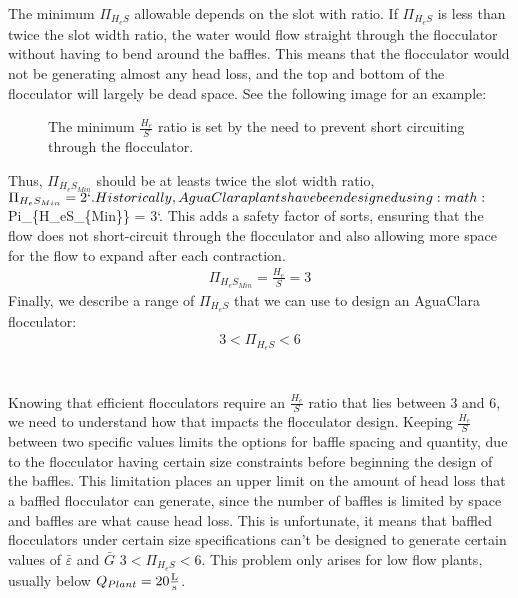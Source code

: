 \documentclass[letterpaper,10pt,english]{sphinxmanual}
\let\sphinxpxdimen\pdfpxdimen\else\newdimen\sphinxpxdimen
\begin{document}
The minimum \(\Pi_{H_eS}\) allowable depends on the slot with ratio. If \(\Pi_{H_eS}\) is less than twice the slot width ratio, the water would flow straight through the flocculator without having to bend around the baffles. This means that the flocculator would not be generating almost any head loss, and the top and bottom of the flocculator will largely be dead space. See the following image for an example:

\begin{figure}[htbp]
\centering
\capstart

\noindent\sphinxincludegraphics[width=600\sphinxpxdimen]{{HeS_ratio_min}.jpg}
\caption{The minimum \(\frac{H_e}{S}\) ratio is set by the need to prevent short circuiting through the flocculator.}\label{\detokenize{Flocculation/Floc_Design:id11}}\label{\detokenize{Flocculation/Floc_Design:figure-hes-ratio-min}}\end{figure}

Thus, \(\Pi_{H_eS_{Min}}\) should be at leasts twice the slot width ratio, \(\Pi_{H_eS_{Min}} = 2 ` . Historically, AguaClara plants have been designed using :math:\)Pi\_\{H\_eS\_\{Min\}\} = 3{}`. This adds a safety factor of sorts, ensuring that the flow does not short-circuit through the flocculator and also allowing more space for the flow to expand after each contraction.
\begin{equation}\label{equation:Flocculation/Floc_Design:Flocculation/Floc_Design:13}
\begin{split}\Pi_{H_eS_{Min}} = \frac{H_e}{S} = 3\end{split}
\end{equation}
Finally, we describe a range of \(\Pi_{H_eS}\) that we can use to design an AguaClara flocculator:
\begin{equation}\label{equation:Flocculation/Floc_Design:Flocculation/Floc_Design:14}
\begin{split}3 < \Pi_{H_eS} < 6\end{split}
\end{equation}

\section{}
\label{\detokenize{Flocculation/Floc_Design:obstacles}}
Knowing that efficient flocculators require an \(\frac{H_e}{S}\) ratio that lies between 3 and 6, we need to understand how that impacts the flocculator design. Keeping \(\frac{H_e}{S}\) between two specific values limits the options for baffle spacing and quantity, due to the flocculator having certain size constraints before beginning the design of the baffles. This limitation places an upper limit on the amount of head loss that a baffled flocculator can generate, since the number of baffles is limited by space and baffles are what cause head loss. This is unfortunate, it means that baffled flocculators under certain size specifications can’t be designed to generate certain values of \(\bar \varepsilon\) and \(\bar G\)  \(3 < \Pi_{H_eS} < 6\). This problem only arises for low flow plants, usually below \(Q_{Plant} = 20 {\rm \frac{L}{s}}\).
\end{document}
